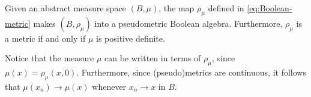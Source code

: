 \documentclass[article, a4paper, 11pt, oneside]{memoir}
\numberwithin{equation}{chapter}
\begin{document}
\begin{proposition}
    Given an abstract measure space $(B,\mu)$, the map $\rho_\mu$ defined in \eqref{eq:Boolean-metric} makes $(B,\rho_\mu)$ into a pseudometric Boolean algebra. Furthermore, $\rho_\mu$ is a metric if and only if $\mu$ is positive definite.
\end{proposition}
%
Notice that the measure $\mu$ can be written in terms of $\rho_\mu$, since $\mu(x) = \rho_\mu(x,0)$. Furthermore, since (pseudo)metrics are continuous, it follows that $\mu(x_n) \to \mu(x)$ whenever $x_n \to x$ in $B$.

\newcommand{\mylistlabelfont}[1]{{\normalfont\color{linkcolor}\textit{#1}:}}
\end{document}
